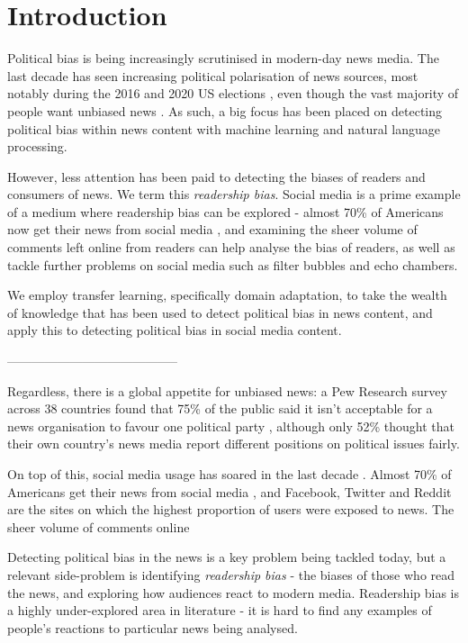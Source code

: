 \chapter{Introduction}

Political bias is being increasingly scrutinised in modern-day news media. The last decade has seen increasing political polarisation of news sources, most notably during the 2016 and 2020 US elections \cite{us-election}, even though the vast majority of people want unbiased news \cite{pew-unbiased}. As such, a big focus has been placed on detecting political bias within news content with machine learning and natural language processing.

However, less attention has been paid to detecting the biases of readers and consumers of news. We term this \textit{readership bias}. Social media is a prime example of a medium where readership bias can be explored - almost 70\% of Americans now get their news from social media \cite{pew-social-media-news-2018}, and examining the sheer volume of comments left online from readers can help analyse the bias of readers, as well as tackle further problems on social media such as filter bubbles and echo chambers.

We employ transfer learning, specifically domain adaptation, to take the wealth of knowledge that has been used to detect political bias in news content, and apply this to detecting political bias in social media content. 

-----------------------------------------


Regardless, there is a global appetite for unbiased news: a Pew Research survey across 38 countries found that 75\% of the public said it isn't acceptable for a news organisation to favour one political party \cite{pew-unbiased}, although only 52\% thought that their own country's news media report different positions on political issues fairly.

On top of this, social media usage has soared in the last decade \cite{rise-of-social-media}. Almost 70\% of Americans get their news from social media \cite{pew-social-media-news-2018}, and Facebook, Twitter and Reddit are the sites on which the highest proportion of users were exposed to news. The sheer volume of comments online 


Detecting political bias in the news is a key problem being tackled today, but a relevant side-problem is identifying \textit{readership bias} - the biases of those who read the news, and exploring how audiences react to modern media. Readership bias is a highly under-explored area in literature - it is hard to find any examples of people's reactions to particular news being analysed.


